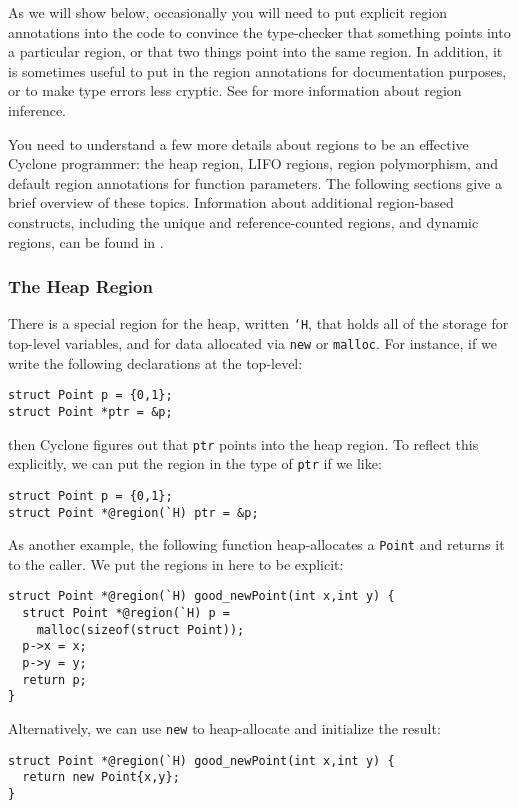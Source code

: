 As we will show below, occasionally you will need to put explicit
region annotations into the code to convince the type-checker that
something points into a particular region, or that two things point
into the same region.  In addition, it is sometimes useful to put in
the region annotations for documentation purposes, or to make type
errors less cryptic.  See
for more information about region inference.


You need to understand a few more details about regions to
be an effective Cyclone programmer:  the heap region, LIFO
regions, region polymorphism, and default region 
annotations for
function parameters.  The following sections give a brief overview
of these topics.  Information about additional region-based
constructs, including the unique and reference-counted regions, and
dynamic regions, can be found in
.

\subsubsection*{The Heap Region}

There is a special region for the heap, written \texttt{`H}, that
holds all of the storage for top-level variables, and for data
allocated via \texttt{new} or \texttt{malloc}.  For instance, if we
write the following declarations at the top-level:
\begin{verbatim}
struct Point p = {0,1};
struct Point *ptr = &p;
\end{verbatim}
then Cyclone figures out that \texttt{ptr} points into the heap
region.  To reflect this explicitly, we can put the region in
the type of \texttt{ptr} if we like:
\begin{verbatim}
struct Point p = {0,1};
struct Point *@region(`H) ptr = &p;
\end{verbatim}

As another example, the following function heap-allocates a \texttt{Point} and
returns it to the caller.  We put the regions in here to be explicit:
\begin{verbatim}
struct Point *@region(`H) good_newPoint(int x,int y) {
  struct Point *@region(`H) p = 
    malloc(sizeof(struct Point));
  p->x = x;
  p->y = y;
  return p;
}
\end{verbatim}
Alternatively, we can use \texttt{new} to heap-allocate and 
initialize the result:
\begin{verbatim}
struct Point *@region(`H) good_newPoint(int x,int y) {
  return new Point{x,y};
}
\end{verbatim}

